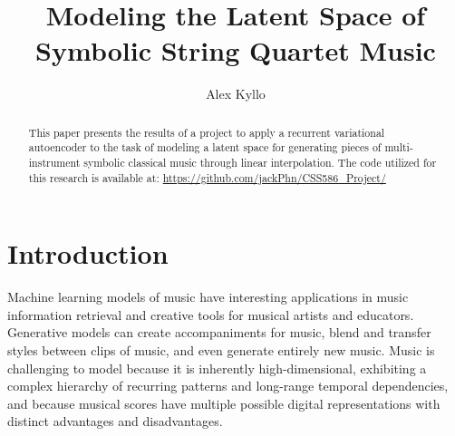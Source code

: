 \documentclass[sigconf,authorversion]{acmart}
\begin{document}
\renewcommand\footnotetextcopyrightpermission[1]{}
\pagestyle{plain}
\title{Modeling the Latent Space of Symbolic String Quartet Music}


\author{Alex Kyllo}

\begin{abstract}
  This paper presents the results of a project to apply a recurrent
  variational autoencoder to the task of modeling a latent space for
  generating pieces of multi-instrument symbolic classical music
  through linear interpolation. The code utilized for this research is
  available at: \url{https://github.com/jackPhn/CSS586_Project/}
\end{abstract}


\maketitle

\section{Introduction}

Machine learning models of music have interesting applications in
music information retrieval and creative tools for musical artists and
educators. Generative models can create accompaniments for music,
blend and transfer styles between clips of music, and even generate
entirely new music. Music is challenging to model because it is
inherently high-dimensional, exhibiting a complex hierarchy of
recurring patterns and long-range temporal dependencies, and because
musical scores have multiple possible digital representations with
distinct advantages and disadvantages.
\end{document}
